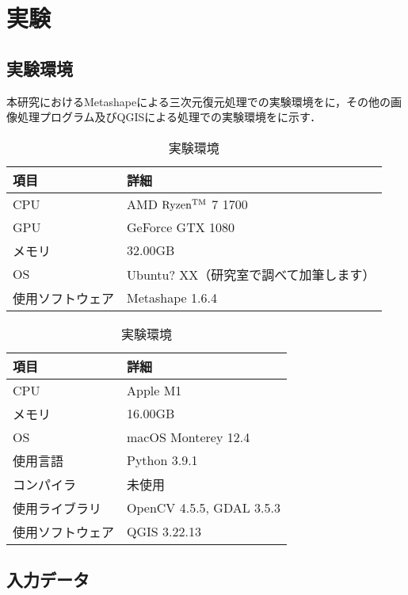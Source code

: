 \chapter{実験}
  \section{実験環境}
    本研究におけるMetashapeによる三次元復元処理での実験環境をに，その他の画像処理プログラム及びQGISによる処理での実験環境をに示す．

    \begin{table}[t]
      \centering
      \caption{実験環境}
      \label{実験環境1}
      \begin{tabular}{ll}
        \hline
        \textbf{項目} & \textbf{詳細} \\
        \hline \hline
        CPU & AMD $\rm{Ryzen^{TM}}$ 7 1700 \\
        GPU & GeForce GTX 1080 \\
        メモリ & 32.00GB \\
        OS & Ubuntu? XX（研究室で調べて加筆します） \\
        使用ソフトウェア & Metashape 1.6.4 \\ \hline 
      \end{tabular}
    \end{table}

    \begin{table}[t]
      \centering
      \caption{実験環境}
      \label{実験環境2}
      \begin{tabular}{ll}
        \hline
        \textbf{項目} & \textbf{詳細} \\
        \hline \hline
        CPU & Apple M1 \\
        メモリ & 16.00GB \\
        OS & macOS Monterey 12.4 \\
        使用言語 & Python 3.9.1 \\
        コンパイラ & 未使用 \\
        使用ライブラリ & OpenCV 4.5.5, GDAL 3.5.3 \\ 
        使用ソフトウェア & QGIS 3.22.13 \\ \hline 
      \end{tabular}
    \end{table}



  \section{入力データ}
    \label{入力データ（実験）}
